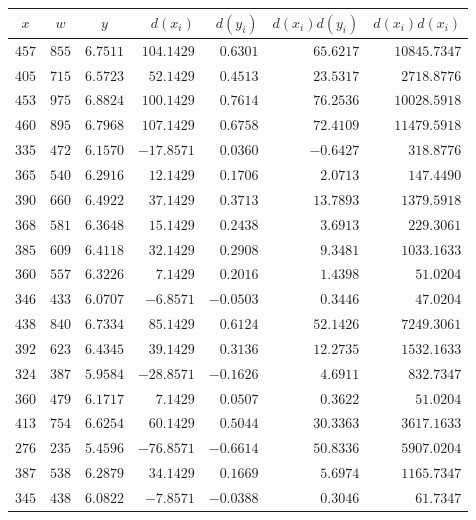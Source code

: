 \begin{tabular}{cccrrrr} \toprule
$x$   & $w$    & $y$      & $d(x_i)$    & $d(y_i)$  & $d(x_i) d(y_i)$ & $d(x_i) d(x_i)$ \\\midrule
$457$ & $855$  & $6.7511$ & $104.1429$  & $0.6301$  & $65.6217$      & $10845.7347$    \\
$405$ & $715$  & $6.5723$ & $52.1429$   & $0.4513$  & $23.5317$      & $2718.8776$     \\
$453$ & $975$  & $6.8824$ & $100.1429$  & $0.7614$  & $76.2536$      & $10028.5918$    \\
$460$ & $895$  & $6.7968$ & $107.1429$  & $0.6758$  & $72.4109$      & $11479.5918$    \\
$335$ & $472$  & $6.1570$ & $-17.8571$  & $0.0360$  & $-0.6427$      & $318.8776$      \\
$365$ & $540$  & $6.2916$ & $12.1429$   & $0.1706$  & $2.0713$       & $147.4490$      \\
$390$ & $660$  & $6.4922$ & $37.1429$   & $0.3713$  & $13.7893$      & $1379.5918$     \\
$368$ & $581$  & $6.3648$ & $15.1429$   & $0.2438$  & $3.6913$       & $229.3061$      \\
$385$ & $609$  & $6.4118$ & $32.1429$   & $0.2908$  & $9.3481$       & $1033.1633$     \\
$360$ & $557$  & $6.3226$ & $7.1429$    & $0.2016$  & $1.4398$       & $51.0204$       \\
$346$ & $433$  & $6.0707$ & $-6.8571$   & $-0.0503$ & $0.3446$       & $47.0204$       \\
$438$ & $840$  & $6.7334$ & $85.1429$   & $0.6124$  & $52.1426$      & $7249.3061$     \\
$392$ & $623$  & $6.4345$ & $39.1429$   & $0.3136$  & $12.2735$      & $1532.1633$     \\
$324$ & $387$  & $5.9584$ & $-28.8571$  & $-0.1626$ & $4.6911$       & $832.7347$      \\
$360$ & $479$  & $6.1717$ & $7.1429$    & $0.0507$  & $0.3622$       & $51.0204$       \\
$413$ & $754$  & $6.6254$ & $60.1429$   & $0.5044$  & $30.3363$      & $3617.1633$     \\
$276$ & $235$  & $5.4596$ & $-76.8571$  & $-0.6614$ & $50.8336$      & $5907.0204$     \\
$387$ & $538$  & $6.2879$ & $34.1429$   & $0.1669$  & $5.6974$       & $1165.7347$     \\
$345$ & $438$  & $6.0822$ & $-7.8571$   & $-0.0388$ & $0.3046$       & $61.7347$       \\

\end{tabular}
